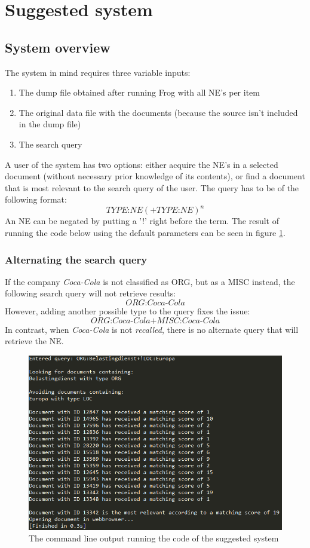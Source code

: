 \section{Suggested system} \label{app:sug_sys}
\subsection{System overview}
The system in mind requires three variable inputs:
\begin{enumerate}
\item The dump file obtained after running Frog with all NE's per item
\item The original data file with the documents (because the source isn't included in the dump file)
\item The search query
\end{enumerate}
A user of the system has two options: either acquire the NE's in a selected document (without necessary prior knowledge of its contents), or find a document that is most relevant to the search query of the user. The query has to be of the following format: $$TYPE{\text{:}}NE(+TYPE{\text{:}}NE)^n$$ An NE can be negated by putting a '!' right before the term. The result of running the code below using the default parameters can be seen in figure \ref{fig:sys_out}.

\subsubsection{Alternating the search query}\label{app:alt_query}
If the company \textit{Coca-Cola} is not classified as ORG, but as a MISC instead, the following search query will not retrieve results: $$ORG\text{:}Coca\text{-}Cola$$
However, adding another possible type to the query fixes the issue:
$$ORG\text{:}Coca\text{-}Cola\text{+}MISC\text{:}Coca\text{-}Cola$$
In contrast, when \textit{Coca-Cola} is not \emph{recalled}, there is no alternate query that will retrieve the NE. 

\begin{figure}
    \centering
    \includegraphics[scale=0.8]{fig/sys_out}
    \caption{The command line output running the code of the suggested system}
    \label{fig:sys_out}
\end{figure}

